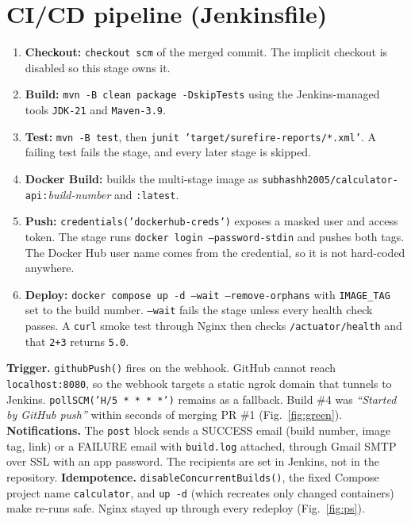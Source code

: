 \documentclass[10pt,a4paper]{article}
\newcommand{\cmd}[1]{\texttt{#1}}
\begin{document}
\section{CI/CD pipeline (Jenkinsfile)}
\begin{enumerate}
  \item \textbf{Checkout:} \cmd{checkout scm} of the merged commit. The implicit checkout is disabled so this stage owns it.
  \item \textbf{Build:} \cmd{mvn -B clean package -DskipTests} using the Jenkins-managed tools \cmd{JDK-21} and \cmd{Maven-3.9}.
  \item \textbf{Test:} \cmd{mvn -B test}, then \cmd{junit 'target/surefire-reports/*.xml'}. A failing test fails the stage, and every later stage is skipped.
  \item \textbf{Docker Build:} builds the multi-stage image as \cmd{subhashh2005/calculator-api:}\textit{build-number} and \cmd{:latest}.
  \item \textbf{Push:} \cmd{credentials('dockerhub-creds')} exposes a masked user and access token. The stage runs \cmd{docker login --password-stdin} and pushes both tags. The Docker Hub user name comes from the credential, so it is not hard-coded anywhere.
  \item \textbf{Deploy:} \cmd{docker compose up -d --wait --remove-orphans} with \cmd{IMAGE\_TAG} set to the build number. \cmd{--wait} fails the stage unless every health check passes. A \cmd{curl} smoke test through Nginx then checks \cmd{/actuator/health} and that \cmd{2+3} returns \cmd{5.0}.
\end{enumerate}
\textbf{Trigger.} \cmd{githubPush()} fires on the webhook. GitHub cannot reach \cmd{localhost:8080}, so the webhook targets a static ngrok domain that tunnels to Jenkins. \cmd{pollSCM('H/5 * * * *')} remains as a fallback.
Build \#4 was \emph{``Started by GitHub push''} within seconds of merging PR \#1 (Fig.~\ref{fig:green}).
\textbf{Notifications.} The \cmd{post} block sends a SUCCESS email (build number, image tag, link) or a FAILURE email with \cmd{build.log} attached, through Gmail SMTP over SSL with an app password. The recipients are set in Jenkins, not in the repository.
\textbf{Idempotence.} \cmd{disableConcurrentBuilds()}, the fixed Compose project name \cmd{calculator}, and \cmd{up -d} (which recreates only changed containers) make re-runs safe. Nginx stayed up through every redeploy (Fig.~\ref{fig:ps}).
\end{document}
